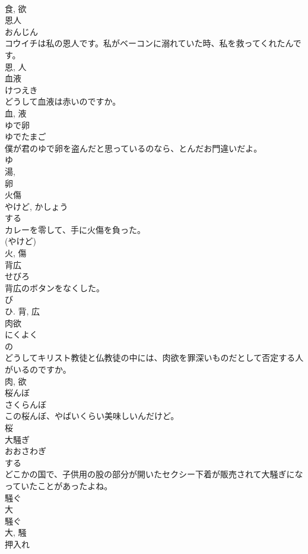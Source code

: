 \documentclass[8pt]{extreport}
\begin{document}
\begin{CJK}{UTF8}{min}
\\	食, 欲	
\\	恩人	
\\	おんじん	
\\	コウイチは私の恩人です。私がベーコンに溺れていた時、私を救ってくれたんです。	
\\	恩, 人	
\\	血液	
\\	けつえき	
\\	どうして血液は赤いのですか。	
\\	血, 液	
\\	ゆで卵	
\\	ゆでたまご	
\\	僕が君のゆで卵を盗んだと思っているのなら、とんだお門違いだよ。	
\\	ゆ 
\\	湯, 
\\	卵	
\\	火傷	
\\	やけど, かしょう	
\\	する 
\\	カレーを零して、手に火傷を負った。	
\\	(やけど) 
\\	火, 傷	
\\	背広	
\\	せびろ	
\\	背広のボタンをなくした。	
\\	び 
\\	ひ.	背, 広	
\\	肉欲	
\\	にくよく	
\\	の 
\\	どうしてキリスト教徒と仏教徒の中には、肉欲を罪深いものだとして否定する人がいるのですか。	
\\	肉, 欲	
\\	桜んぼ	
\\	さくらんぼ	
\\	この桜んぼ、やばいくらい美味しいんだけど。	
\\	桜	
\\	大騒ぎ	
\\	おおさわぎ	
\\	する 
\\	どこかの国で、子供用の股の部分が開いたセクシー下着が販売されて大騒ぎになっていたことがあったよね。	
\\	騒ぐ 
\\	大 
\\	騒ぐ 
\\	大, 騒	
\\	押入れ	

\end{CJK}
\end{document}
